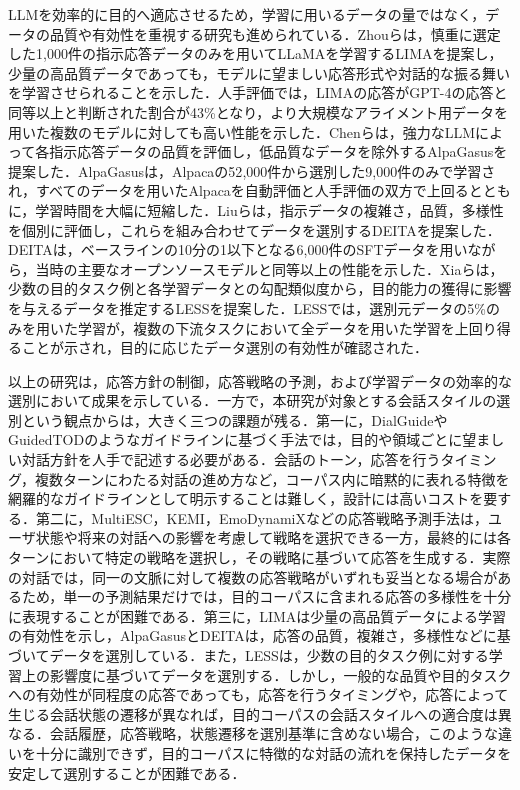 \documentclass[manuscript,review,anonymous]{acmart}
\begin{document}
LLMを効率的に目的へ適応させるため，学習に用いるデータの量ではなく，データの品質や有効性を重視する研究も進められている．Zhouらは，慎重に選定した1{,}000件の指示応答データのみを用いてLLaMAを学習するLIMAを提案し，少量の高品質データであっても，モデルに望ましい応答形式や対話的な振る舞いを学習させられることを示した\cite{zhou2023lima}．人手評価では，LIMAの応答がGPT-4の応答と同等以上と判断された割合が43\%となり，より大規模なアライメント用データを用いた複数のモデルに対しても高い性能を示した．Chenらは，強力なLLMによって各指示応答データの品質を評価し，低品質なデータを除外するAlpaGasusを提案した\cite{chen2023alpagasus}．AlpaGasusは，Alpacaの52{,}000件から選別した9{,}000件のみで学習され，すべてのデータを用いたAlpacaを自動評価と人手評価の双方で上回るとともに，学習時間を大幅に短縮した．Liuらは，指示データの複雑さ，品質，多様性を個別に評価し，これらを組み合わせてデータを選別するDEITAを提案した\cite{liu2024deita}．DEITAは，ベースラインの10分の1以下となる6{,}000件のSFTデータを用いながら，当時の主要なオープンソースモデルと同等以上の性能を示した．Xiaらは，少数の目的タスク例と各学習データとの勾配類似度から，目的能力の獲得に影響を与えるデータを推定するLESSを提案した\cite{xia2024less}．LESSでは，選別元データの5\%のみを用いた学習が，複数の下流タスクにおいて全データを用いた学習を上回り得ることが示され，目的に応じたデータ選別の有効性が確認された．

以上の研究は，応答方針の制御，応答戦略の予測，および学習データの効率的な選別において成果を示している．一方で，本研究が対象とする会話スタイルの選別という観点からは，大きく三つの課題が残る．第一に，DialGuideやGuidedTODのようなガイドラインに基づく手法では，目的や領域ごとに望ましい対話方針を人手で記述する必要がある．会話のトーン，応答を行うタイミング，複数ターンにわたる対話の進め方など，コーパス内に暗黙的に表れる特徴を網羅的なガイドラインとして明示することは難しく，設計には高いコストを要する．第二に，MultiESC，KEMI，EmoDynamiXなどの応答戦略予測手法は，ユーザ状態や将来の対話への影響を考慮して戦略を選択できる一方，最終的には各ターンにおいて特定の戦略を選択し，その戦略に基づいて応答を生成する．実際の対話では，同一の文脈に対して複数の応答戦略がいずれも妥当となる場合があるため，単一の予測結果だけでは，目的コーパスに含まれる応答の多様性を十分に表現することが困難である．第三に，LIMAは少量の高品質データによる学習の有効性を示し，AlpaGasusとDEITAは，応答の品質，複雑さ，多様性などに基づいてデータを選別している．また，LESSは，少数の目的タスク例に対する学習上の影響度に基づいてデータを選別する．しかし，一般的な品質や目的タスクへの有効性が同程度の応答であっても，応答を行うタイミングや，応答によって生じる会話状態の遷移が異なれば，目的コーパスの会話スタイルへの適合度は異なる．会話履歴，応答戦略，状態遷移を選別基準に含めない場合，このような違いを十分に識別できず，目的コーパスに特徴的な対話の流れを保持したデータを安定して選別することが困難である．
\end{document}
